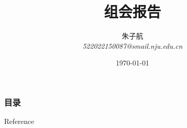 \documentclass{njupre/njupre}
\title[组会报告]{ 组会报告 }
\author[朱子航]{\texorpdfstring{朱子航 \\ \smallskip \textit{522022150087@smail.nju.edu.cn}}{}}
\date[\today]{\texorpdfstring{\today}{}}
\begin{document}
\begin{frame}
    \titlepage
\end{frame}

\begin{frame}
    \frametitle{目录}
    \tableofcontents
\end{frame}

\begin{frame}[allowframebreaks]{Reference}
    
    
\end{frame}
\end{document}
